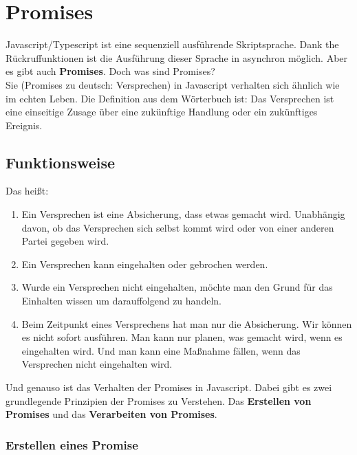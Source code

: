 \section{Promises}
Javascript/Typescript ist eine sequenziell ausführende Skriptsprache. Dank the Rückruffunktionen ist die Ausführung dieser Sprache in asynchron möglich. Aber es gibt auch \textbf{Promises}. Doch was sind Promises? \\

\noindent
Sie (\glqq{}Promises\grqq{} zu deutsch: Versprechen) in Javascript verhalten sich ähnlich wie im echten Leben. Die Definition aus dem Wörterbuch ist: Das Versprechen ist eine einseitige Zusage über eine zukünftige Handlung oder ein zukünftiges Ereignis. \cite{versprechen} \\

\subsection{Funktionsweise}
Das heißt:

\begin{enumerate}
    \item Ein Versprechen ist eine Absicherung, dass etwas gemacht wird. Unabhängig davon, ob das Versprechen sich selbst kommt wird oder von einer anderen Partei gegeben wird.
    
    \item Ein Versprechen kann eingehalten oder gebrochen werden.
    
    \item Wurde ein Versprechen nicht eingehalten, möchte man den Grund für das Einhalten wissen um darauffolgend zu handeln.
    
    \item Beim Zeitpunkt eines Versprechens hat man nur die Absicherung. Wir können es nicht sofort ausführen. Man kann nur planen, was gemacht wird, wenn es eingehalten wird. Und man kann eine Maßnahme fällen, wenn das Versprechen nicht eingehalten wird.
    
\end{enumerate}

Und genauso ist das Verhalten der Promises in Javascript. Dabei gibt es zwei grundlegende Prinzipien der Promises zu Verstehen. Das \textbf{Erstellen von Promises} und das \textbf{Verarbeiten von Promises}.

\subsubsection{Erstellen eines Promise}


